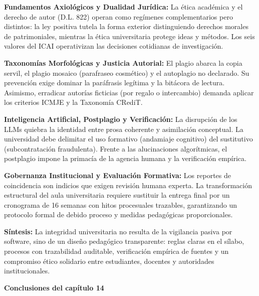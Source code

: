 \begin{resumenlist}
    \item \textbf{Fundamentos Axiológicos y Dualidad Jurídica:} La ética académica y el derecho de autor (D.L. 822) operan como regímenes complementarios pero distintos: la ley positiva tutela la forma exterior distinguiendo derechos morales de patrimoniales, mientras la ética universitaria protege ideas y métodos. Los seis valores del ICAI operativizan las decisiones cotidianas de investigación.
    \item \textbf{Taxonomías Morfológicas y Justicia Autorial:} El plagio abarca la copia servil, el plagio mosaico (parafraseo cosmético) y el autoplagio no declarado. Su prevención exige dominar la paráfrasis legítima y la bitácora de lectura. Asimismo, erradicar autorías ficticias (por regalo o intercambio) demanda aplicar los criterios ICMJE y la Taxonomía CRediT.
    \item \textbf{Inteligencia Artificial, Postplagio y Verificación:} La disrupción de los LLMs quiebra la identidad entre prosa coherente y asimilación conceptual. La universidad debe delimitar el uso formativo (andamiaje cognitivo) del sustitutivo (subcontratación fraudulenta). Frente a las alucinaciones algorítmicas, el postplagio impone la primacía de la agencia humana y la verificación empírica.
    \item \textbf{Gobernanza Institucional y Evaluación Formativa:} Los reportes de coincidencia son indicios que exigen revisión humana experta. La transformación estructural del aula universitaria requiere sustituir la entrega final por un cronograma de 16 semanas con hitos procesuales trazables, garantizando un protocolo formal de debido proceso y medidas pedagógicas proporcionales.
\end{resumenlist}

\vspace{0.4cm}
\begin{cajabeige}
\textbf{Síntesis:} La integridad universitaria no resulta de la vigilancia pasiva por software, sino de un diseño pedagógico transparente: reglas claras en el sílabo, procesos con trazabilidad auditable, verificación empírica de fuentes y un compromiso ético solidario entre estudiantes, docentes y autoridades institucionales.
\end{cajabeige}

\newpage
{}
\vspace*{0.6cm}
{\Huge \textbf{Conclusiones del capítulo 14}}
\vspace{0.5cm}

